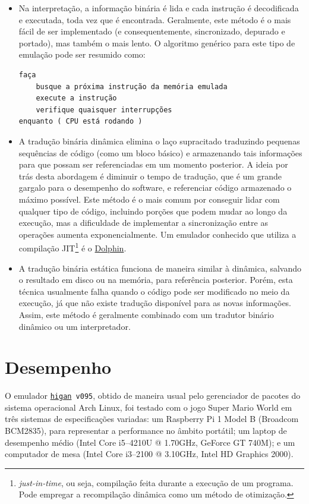 \documentclass[12pt]{sftex/sftex}
\begin{document}
\begin{itemize}

\item Na interpretação, a informação binária é lida e cada instrução é
decodificada e executada, toda vez que é encontrada. Geralmente, este método é
o mais fácil de ser implementado (e consequentemente, sincronizado, depurado
e portado), mas também o mais lento. O algoritmo genérico para este tipo de
emulação pode ser resumido como:

\begin{verbatim}
faça
    busque a próxima instrução da memória emulada
    execute a instrução
    verifique quaisquer interrupções
enquanto ( CPU está rodando )
\end{verbatim}

\item A tradução binária dinâmica elimina o laço supracitado traduzindo pequenas
sequências de código (como um bloco básico) e armazenando tais informações para
que possam ser referenciadas em um momento posterior. A ideia por trás desta
abordagem é diminuir o tempo de tradução, que é um grande gargalo para o
desempenho do software, e referenciar código armazenado o máximo possível. Este
método é o mais comum por conseguir lidar com qualquer tipo de código, incluindo
porções que podem mudar ao longo da execução, mas a dificuldade de implementar a
sincronização entre as operações aumenta exponencialmente. Um emulador conhecido
que utiliza a compilação JIT\footnote{\emph{just-in-time}, ou seja, compilação
feita durante a execução de um programa. Pode empregar a recompilação dinâmica
como um método de otimização.} é o \href{https://dolphin-emu.org/}{Dolphin}.

\item A tradução binária estática funciona de maneira similar à dinâmica,
salvando o resultado em disco ou na memória, para referência posterior. Porém,
esta técnica usualmente falha quando o código pode ser modificado no meio da
execução, já que não existe tradução disponível para as novas informações.
Assim, este método é geralmente combinado com um tradutor binário dinâmico ou um
interpretador.

\end{itemize}

\section{Desempenho}

O emulador \texttt{\href{http://byuu.org/emulation/higan/}{higan} v095}, obtido
de maneira usual pelo gerenciador de pacotes do sistema operacional Arch Linux,
foi testado com o jogo Super Mario World em três sistemas de especificações
variadas: um Raspberry Pi 1 Model B (Broadcom BCM2835), para representar a
performance no âmbito portátil; um laptop de desempenho médio (Intel Core
i5--4210U @ 1.70GHz, GeForce GT 740M); e um computador de mesa (Intel Core
i3--2100 @ 3.10GHz, Intel HD Graphics 2000).
\end{document}
